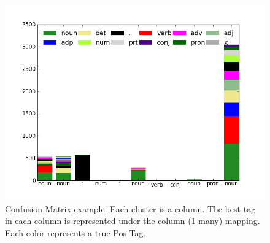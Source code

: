 \begin{figure}[h!]
\centering
\includegraphics[scale=.5]{figs/sequences/cm_uns1.png}
\caption{\label{fig:cm_uns} Confusion Matrix example. Each cluster is a column. The best tag in each column is represented under the column (1-many) mapping. Each color represents a true Pos Tag.}
\end{figure}


